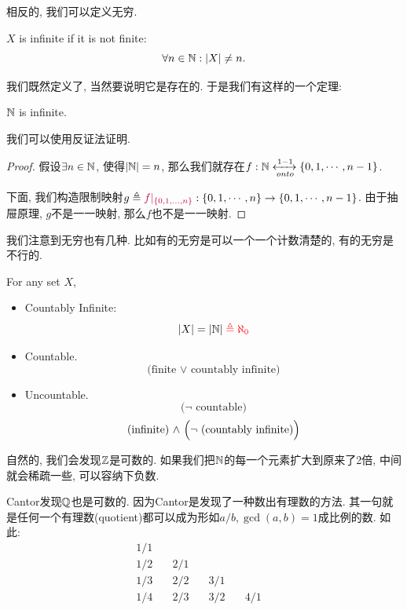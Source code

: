 相反的, 我们可以定义无穷. 

\begin{definition}[Infinite]
    $X$ is infinite if it is not finite:
    \[
      \forall n \in \mathbb{N}: |X| \neq n.
    \]
\end{definition}

我们既然定义了, 当然要说明它是存在的. 于是我们有这样的一个定理: 

\begin{theorem}
    $\mathbb{N}$ is infinite.{}
\end{theorem}

我们可以使用反证法证明. 

\begin{proof}
    假设$\exists n \in \mathbb{N}$, 使得$|\mathbb{N}|=n$, 那么我们就存在$f:\mathbb{N} \xleftrightarrow[onto]{1-1} \{0, 1, \cdots, n-1\}$. 

    下面, 我们构造限制映射$g \triangleq \textcolor{purple}{f|_{\{0, 1, \ldots, n\}}}: \{0, 1, \cdots, n\} \to \{0, 1, \cdots, n-1\}$. 由于抽屉原理, $g$不是一一映射, 那么$f$也不是一一映射. 

\end{proof}

我们注意到无穷也有几种. 比如有的无穷是可以一个一个计数清楚的, 有的无穷是不行的. 

\begin{definition}[Infinite]
    For any set $X$,
    \begin{itemize}
      \item Countably Infinite: 
        \[
          |X| = |\mathbb{N}| \textcolor{red}{\;\triangleq \aleph_{0}}
        \]
      \item Countable.
        \[
          \text{(finite $\lor$ countably infinite)}
        \]
      \item Uncountable. 
        \[
          \text{($\lnot$ countable)}
        \]
        \[
          \text{(infinite) $\land$ \Big($\lnot$ (countably infinite)\Big)}
        \]
    \end{itemize}
  \end{definition}

自然的, 我们会发现$\mathbb{Z}$是可数的. 如果我们把$\mathbb{N}$的每一个元素扩大到原来了2倍, 中间就会稀疏一些, 可以容纳下负数. 

Cantor发现$\mathbb{Q}$也是可数的. 因为Cantor是发现了一种数出有理数的方法. 其一句就是任何一个有理数(quotient)都可以成为形如$a/b, \gcd(a, b)=1$成比例的数. 如此: 
$$
\begin{aligned}
  1/1\quad &\quad &\quad & \quad\\
  1/2\quad &2/1\quad&\quad &\quad\\
  1/3\quad &2/2\quad&3/1\quad&\quad\\
  1/4\quad&2/3\quad&3/2\quad&4/1\quad \\
\end{aligned}
$$

